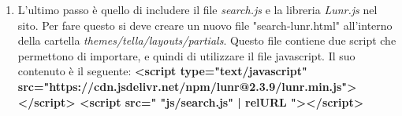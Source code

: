 \documentclass[target=bach,aauheader=]{thud}
\begin{document}
\begin{enumerate}
    \item L'ultimo passo è quello di includere il file \textit{search.js} e la libreria \textit{Lunr.js} nel sito. Per fare questo si deve creare un nuovo file "search-lunr.html" all'interno della cartella \textit{themes/tella/layouts/partials}. 
    Questo file contiene due script che permettono di importare, e quindi di utilizzare il file javascript. Il suo contenuto è il seguente:
    \newline \newline
    \textbf{
        <script type="text/javascript" src="https://cdn.jsdelivr.net/npm/lunr@2.3.9/lunr.min.js">} \textbf{</script>
        \newline
        <script src="{{ "js/search.js" | relURL }}"></script>
    }
\end{enumerate}
\end{document}
